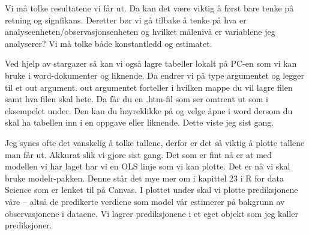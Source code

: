 \documentclass{article}\usepackage[]{graphicx}\usepackage[]{color}
\begin{document}
\hfill \break Vi må tolke resultatene vi får ut. Da kan det være viktig å først bare tenke på retning og signfikans. Deretter bør vi gå tilbake å tenke på hva er analyseenheten/observasjonsenheten og hvilket målenivå er variablene jeg analyserer? Vi må tolke både konstantledd og estimatet. 

\hfill \break Ved hjelp av stargazer så kan vi også lagre tabeller lokalt på PC-en som vi kan bruke i word-dokumenter og liknende. Da endrer vi på type argumentet og legger til et out argument. out argumentet forteller i hvilken mappe du vil lagre filen samt hva filen skal hete. Da får du en .htm-fil som ser omtrent ut som i eksempelet under. Den kan du høyreklikke på og velge åpne i word dersom du skal ha tabellen inn i en oppgave eller liknende. Dette viste jeg sist gang. 

\hfill \break Jeg synes ofte det vanskelig å tolke tallene, derfor er det så viktig å plotte tallene man får ut. Akkurat slik vi gjore sist gang. Det som er fint nå er at med modellen vi har laget har vi en OLS linje som vi kan plotte. Det er nå vi skal bruke modelr-pakken. Denne står det mye mer om i kapittel 23 i R for data Science som er lenket til på Canvas. I plottet under skal vi plotte prediksjonene våre -- altså de predikerte verdiene som model vår estimerer på bakgrunn av observasjonene i dataene. Vi lagrer prediksjonene i et eget objekt som jeg kaller prediksjoner. 
\end{document}
